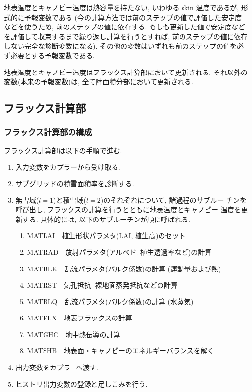 地表温度とキャノピー温度は熱容量を持たない, いわゆる skin 温度であるが,
形式的に予報変数である (今の計算方法では前のステップの値で評価した安定度
などを使うため, 前のステップの値に依存する. もしも更新した値で安定度など
を評価して収束するまで繰り返し計算を行うとすれば, 前のステップの値に依存
しない完全な診断変数になる). その他の変数はいずれも前のステップの値を必
ず必要とする予報変数である.

地表温度とキャノピー温度はフラックス計算部において更新される.
それ以外の変数(本来の予報変数)は, 全て陸面積分部において更新される.

\subsection{フラックス計算部}

\subsubsection{フラックス計算部の構成}

フラックス計算部は以下の手順で進む.
\begin{enumerate}
 \item 入力変数をカプラーから受け取る.
 \item サブグリッドの積雪面積率を診断する.
 \item 無雪域($l=1$)と積雪域($l=2$)のそれぞれについて, 諸過程のサブルー
       チンを呼び出し, フラックスの計算を行うとともに地表温度とキャノピー
       温度を更新する. 具体的には, 以下のサブルーチンが順に呼ばれる.
   \begin{enumerate}
    \item MATLAI\ \ 植生形状パラメタ(LAI, 植生高)のセット
    \item MATRAD\ \ 放射パラメタ(アルベド, 植生透過率など)の計算
    \item MATBLK\ \ 乱流パラメタ(バルク係数)の計算 (運動量および熱)
    \item MATRST\ \ 気孔抵抗, 裸地面蒸発抵抗などの計算
    \item MATBLQ\ \ 乱流パラメタ(バルク係数)の計算 (水蒸気)
    \item MATFLX\ \ 地表フラックスの計算
    \item MATGHC\ \ 地中熱伝導の計算
    \item MATSHB\ \ 地表面・キャノピーのエネルギーバランスを解く
   \end{enumerate}
 \item 出力変数をカプラ−へ渡す.
 \item ヒストリ出力変数の登録と足しこみを行う.
\end{enumerate}

